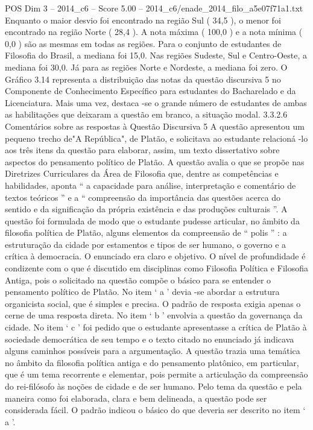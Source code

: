 \begin{textsample}{POS Dim 3 – 2014\_c6 – Score 5.00 – 2014\_c6/enade\_2014\_filo\_a5e07f71a1.txt}
Enquanto o maior desvio foi encontrado na região Sul ( 34,5 ), o menor foi encontrado na região Norte ( 28,4 ).
A nota máxima ( 100,0 ) e a nota mínima ( 0,0 ) são as mesmas em todas as regiões.
Para o conjunto de estudantes de Filosofia do Brasil, a mediana foi 15,0.
Nas regiões Sudeste, Sul e Centro-Oeste, a mediana foi 30,0.
Já para as regiões Norte e Nordeste, a mediana foi zero.
O Gráfico 3.14 representa a distribuição das notas da questão discursiva 5 no Componente de Conhecimento Específico para estudantes do Bacharelado e da Licenciatura.
Mais uma vez, destaca -se o grande número de estudantes de ambas as habilitações que deixaram a questão em branco, a situação modal. 3.3.2.6 Comentários sobre as respostas à Questão Discursiva 5 A questão apresentou um pequeno trecho de"A República", de Platão, e solicitava ao estudante relacioná -lo aos três itens da questão para elaborar, assim, um texto dissertativo sobre aspectos do pensamento político de Platão.
A questão avalia o que se propõe nas Diretrizes Curriculares da Área de Filosofia que, dentre as competências e habilidades, aponta “ a capacidade para análise, interpretação e comentário de textos teóricos ” e a “ compreensão da importância das questões acerca do sentido e da significação da própria existência e das produções culturais ”.
A questão foi formulada de modo que o estudante pudesse articular, no âmbito da filosofia política de Platão, alguns elementos da compreensão de “ polis ” : a estruturação da cidade por estamentos e tipos de ser humano, o governo e a crítica à democracia.
O enunciado era claro e objetivo.
O nível de profundidade é condizente com o que é discutido em disciplinas como Filosofia Política e Filosofia Antiga, pois o solicitado na questão compõe o básico para se entender o pensamento político de Platão.
No item ‘ a ’ devia -se abordar a estrutura organicista social, que é simples e precisa.
O padrão de resposta exigia apenas o cerne de uma resposta direta.
No item ‘ b ’ envolvia a questão da governança da cidade.
No item ‘ c ’ foi pedido que o estudante apresentasse a crítica de Platão à sociedade democrática de seu tempo e o texto citado no enunciado já indicava alguns caminhos possíveis para a argumentação.
A questão trazia uma temática no âmbito da filosofia política antiga e do pensamento platônico, em particular, que é um tema recorrente e elementar, pois permite a articulação da compreensão do rei-filósofo às noções de cidade e de ser humano.
Pelo tema da questão e pela maneira como foi elaborada, clara e bem delineada, a questão pode ser considerada fácil.
O padrão indicou o básico do que deveria ser descrito no item ‘ a ’.

\end{textsample}
